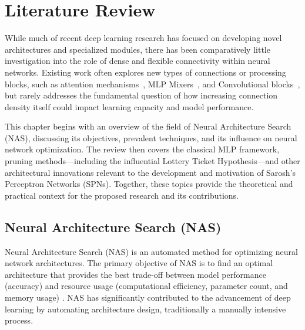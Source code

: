 
\chapter{Literature Review} %

\label{LiteratureReview} %


While much of recent deep learning research has focused on developing novel architectures and specialized modules, there has been comparatively little investigation into the role of dense and flexible connectivity within neural networks. Existing work often explores new types of connections or processing blocks, such as attention mechanisms~\cite{vaswani2017attention}, MLP Mixers~\cite{tolstikhin2021mlp}, and Convolutional blocks~\cite{krizhevsky2012imagenet}, but rarely addresses the fundamental question of how increasing connection density itself could impact learning capacity and model performance.

This chapter begins with an overview of the field of Neural Architecture Search (NAS), discussing its objectives, prevalent techniques, and its influence on neural network optimization. The review then covers the classical MLP framework, pruning methods—including the influential Lottery Ticket Hypothesis—and other architectural innovations relevant to the development and motivation of Sarosh’s Perceptron Networks (SPNs). Together, these topics provide the theoretical and practical context for the proposed research and its contributions.



\section{Neural Architecture Search (NAS)}

Neural Architecture Search (NAS) is an automated method for optimizing neural network architectures. The primary objective of NAS is to find an optimal architecture that provides the best trade-off between model performance (accuracy) and resource usage (computational efficiency, parameter count, and memory usage) \cite{elsken2019neural}. NAS has significantly contributed to the advancement of deep learning by automating architecture design, traditionally a manually intensive process.

